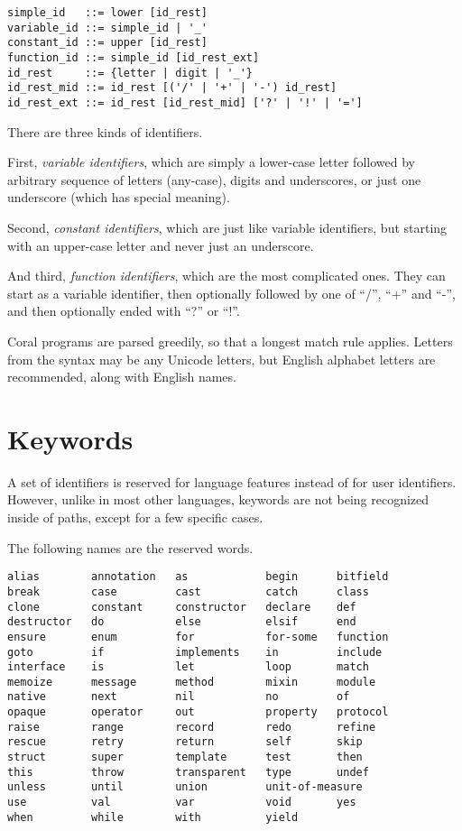\syntax\begin{lstlisting}
simple_id   ::= lower [id_rest]
variable_id ::= simple_id | '_'
constant_id ::= upper [id_rest]
function_id ::= simple_id [id_rest_ext]
id_rest     ::= {letter | digit | '_'}
id_rest_mid ::= id_rest [('/' | '+' | '-') id_rest]
id_rest_ext ::= id_rest [id_rest_mid] ['?' | '!' | '=']
\end{lstlisting}

There are three kinds of identifiers.

First, \textit{variable identifiers}, which are simply a lower-case letter followed by arbitrary sequence of letters (any-case), digits and underscores, or just one underscore (which has special meaning).

Second, \textit{constant identifiers}, which are just like variable identifiers, but starting with an upper-case letter and never just an underscore.

And third, \textit{function identifiers}, which are the most complicated ones. They can start as a variable identifier, then optionally followed by one of ``/'', ``+'' and ``-'', and then optionally ended with ``?'' or ``!''.

Coral programs are parsed greedily, so that a longest match rule applies. Letters from the syntax may be any Unicode letters, but English alphabet letters are recommended, along with English names.

\section{Keywords}\label{sec:keywords}

A set of identifiers is reserved for language features instead of for user identifiers. However, unlike in most other languages, keywords are not being recognized inside of paths, except for a few specific cases.

The following names are the reserved words.

\begin{lstlisting}
alias        annotation   as            begin      bitfield
break        case         cast          catch      class
clone        constant     constructor   declare    def
destructor   do           else          elsif      end
ensure       enum         for           for-some   function
goto         if           implements    in         include
interface    is           let           loop       match
memoize      message      method        mixin      module
native       next         nil           no         of
opaque       operator     out           property   protocol 
raise        range        record        redo       refine
rescue       retry        return        self       skip
struct       super        template      test       then
this         throw        transparent   type       undef
unless       until        union         unit-of-measure
use          val          var           void       yes
when         while        with          yield

\end{lstlisting}

